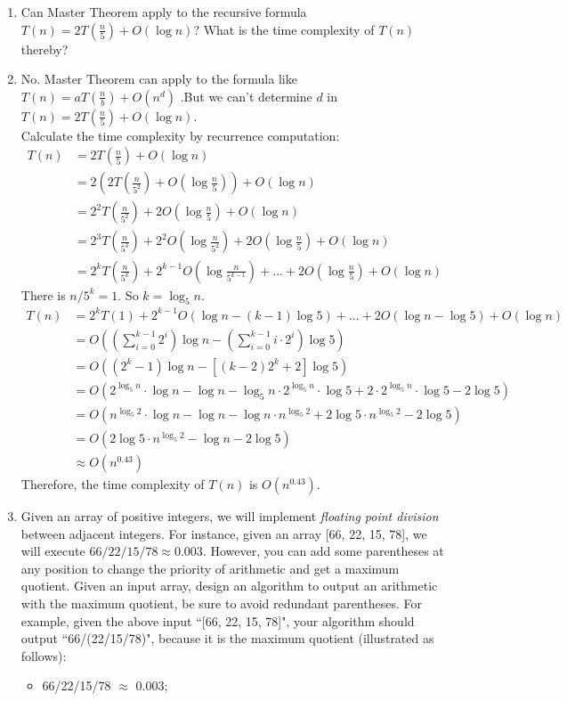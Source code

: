 \documentclass[12pt,a4paper]{article}
\makeatletter
\newtheorem*{solution}{Solution}
\theoremstyle{definition}
\renewenvironment{solution}[1][Solution] {\par\pushQED{\qed}\normalfont\topsep6\p@\@plus6\p@\relax\trivlist\item[\hskip\labelsep\bfseries#1\@addpunct{.}]\ignorespaces}{\popQED\endtrivlist\@endpefalse} \makeatother
\makeatother
\begin{document}
\begin{enumerate}
    \item
    Can Master Theorem apply to the recursive formula $T(n)=2T(\frac{n}{5})+O(\log n)$? What is the time complexity of $T(n)$ thereby?
    \begin{solution}
        No. Master Theorem can apply to the formula like $T(n) =aT(\frac{n}{b})+O(n^d)$ .But we can't determine $d$ in $T(n)=2T(\frac{n}{5})+O(\log n)$. \\
        Calculate the time complexity by recurrence computation:
        \begin{align*}
        	T(n)&=2T(\frac{n}{5})+O(\log n) \\
        	&=2(2T(\frac{n}{5^2})+O(\log \frac{n}{5}))+O(\log n) \\
        	&=2^2T(\frac{n}{5^2})+2O(\log \frac{n}{5})+O(\log n) \\
        	&=2^3T(\frac{n}{5^3})+2^2O(\log \frac{n}{5^2})+2O(\log \frac{n}{5})+O(\log n) \\
        	&=2^{k}T(\frac{n}{5^{k}}) + 2^{k-1}O(\log \frac{n}{5^{k-1}}) + ...+ 2O(\log \frac{n}{5}) + O(\log n)       	
        \end{align*}
    	There is $n/5^{k} = 1$. So $k = \log_5 n$.
    	\begin{align*}
    		T(n)&=2^{k}T(1)+2^{k-1}O(\log n - (k-1)\log 5) +...+ 2O(\log n - \log 5) + O(\log n) \\
    		&=O((\sum_{i=0}^{k-1}2^{i})\log n-(\sum_{i=0}^{k-1}i\cdot2^{i})\log 5) \\
    		&=O((2^{k}-1)\log n-[(k-2)2^{k}+2]\log 5) \\
    		&=O(2^{\log_5 n}\cdot \log n-\log n-\log_5 n\cdot 2^{\log_5 n}\cdot \log 5 + 2\cdot 2^{\log_5 n}\cdot \log 5-2\log 5) \\
    		&=O(n^{\log_5 2}\cdot \log n - \log n - \log n\cdot n^{\log_5 2} + 2\log 5\cdot n^{\log_5 2}-2\log 5) \\
    		&=O(2\log 5\cdot n^{\log_5 2} - \log n - 2\log 5) \\
    		&\approx O(n^{0.43})
    	\end{align*}
    	Therefore, the time complexity of $T(n)$ is $O(n^{0.43})$. 
    \end{solution}

    \item
    Given an array of positive integers, we will implement \emph{floating point division} between adjacent integers. For instance, given an array [66, 22, 15, 78], we will execute $66/22/15/78 \approx 0.003$. However, you can add some parentheses at any position to change the priority of arithmetic and get a maximum quotient. Given an input array, design an algorithm to output an arithmetic with the maximum quotient, be sure to avoid redundant parentheses. For example, given the above input ``[66, 22, 15, 78]", your algorithm should output ``66/(22/15/78)", because it is the maximum quotient (illustrated as follows):
    \begin{itemize}
        \item 66/22/15/78 $\approx$ 0.003; 
        

\end{itemize}
\end{enumerate}
\end{document}
